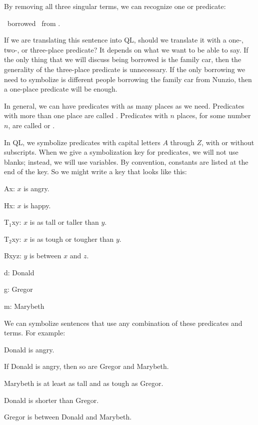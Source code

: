 By removing all three singular terms, we can recognize one  or  predicate:
\begin{center}
\blank\ borrowed \blank\ from \blank.
\end{center}

If we are translating this sentence into QL, should we translate it with a one-, two-, or three-place predicate? It depends on what we want to be able to say. If the only thing that we will discuss being borrowed is the family car, then the generality of the three-place predicate is unnecessary. If the only borrowing we need to symbolize is different people borrowing the family car from Nunzio, then a one-place predicate will be enough.

In general, we can have predicates with as many places as we need. Predicates with more than one place are called . Predicates with $n$ places, for some number $n$, are called  or .

In QL, we symbolize predicates with capital letters $A$ through $Z$, with or without subscripts. When we give a symbolization key for predicates, we will not use blanks; instead, we will use variables. By convention, constants are listed at the end of the key. So we might write a key that looks like this:
\begin{ekey}
\item[Ax:] $x$ is angry.
\item[Hx:] $x$ is happy.
\item[T$_1$xy:] $x$ is as tall or taller than $y$.
\item[T$_2$xy:] $x$ is as tough or tougher than $y$.
\item[Bxyz:] $y$ is between $x$ and $z$.
\item[d:] Donald
\item[g:] Gregor
\item[m:] Marybeth
\end{ekey}

We can symbolize sentences that use any combination of these predicates and terms. For example:
\begin{earg}
\item[\ex{terms1}] Donald is angry.
\item[\ex{terms2}] If Donald is angry, then so are Gregor and Marybeth.
\item[\ex{terms3}] Marybeth is at least as tall and as tough as Gregor.
\item[\ex{terms4}] Donald is shorter than Gregor.
\item[\ex{terms5}] Gregor is between Donald and Marybeth.
\end{earg}


